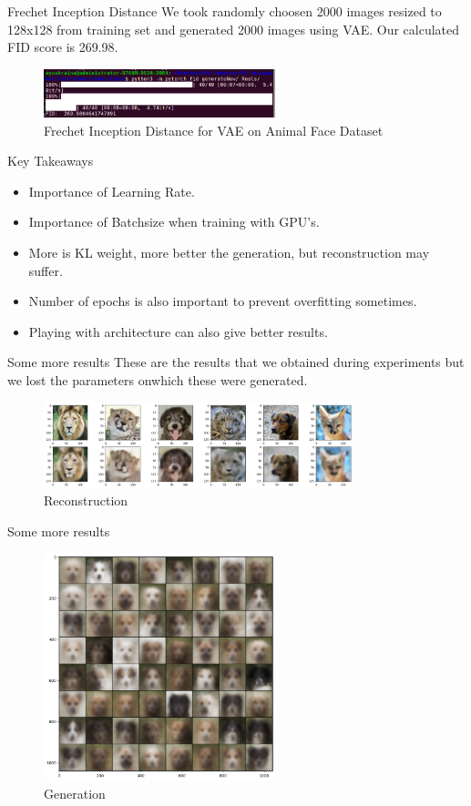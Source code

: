 \begin{frame}{Frechet Inception Distance}
    We took randomly choosen 2000 images resized to 128x128 from training set and generated 2000 images using VAE. Our calculated FID score is 269.98.
    \begin{figure}
        \centering
        \includegraphics[width=0.6\textwidth]{../ReportNeurips/FID.png}
        \caption{Frechet Inception Distance for VAE on Animal Face Dataset}
    \end{figure}
\end{frame}

\begin{frame}{Key Takeaways}
    \begin{itemize}
        \item Importance of Learning Rate.
        \pause
        \item Importance of Batchsize when training with GPU's.
        \pause
        \item More is KL weight, more better the generation, but reconstruction may suffer.
        \pause
        \item Number of epochs is also important to prevent overfitting sometimes.
        \pause
        \item Playing with architecture can also give better results.
    \end{itemize}
\end{frame}

\begin{frame}{Some more results}
    These are the results that we obtained during experiments but we lost the parameters onwhich these were generated.
    \begin{figure}
        \centering
        \includegraphics[width=0.8\textwidth]{../lion.png}
        \caption{Reconstruction}
    \end{figure}
\end{frame}

\begin{frame}{Some more results}
    \begin{figure}
        \centering
        \includegraphics[width=0.6\textwidth]{../dogs1.png}
        \caption{Generation}
    \end{figure}
\end{frame}
